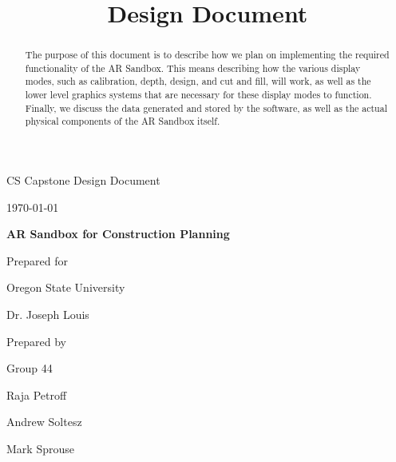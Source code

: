 \documentclass[onecolumn, draftclsnofoot,10pt, compsoc]{IEEEtran}
\title{Design Document}
\def \CapstoneTeamName{		Team Sandy}
\def \CapstoneTeamNumber{		44}
\def \GroupMemberOne{			Raja Petroff			}
\def \GroupMemberTwo{			Andrew Soltesz			}
\def \GroupMemberThree{			Mark Sprouse}
\def \CapstoneProjectName{		AR Sandbox for Construction Planning}
\def \CapstoneSponsorCompany{	Oregon State University}
\def \CapstoneSponsorPerson{		Dr. Joseph Louis}
\def \DocType{		%
				Design Document
				}
\newcommand{\NameSigPair}[1]{\par
\makebox[2.75in][r]{#1} \hfil 	\makebox[3.25in]{\makebox[2.25in]{\hrulefill} \hfill		\makebox[.75in]{\hrulefill}}
\par\vspace{-12pt} \textit{\tiny\noindent
\makebox[2.75in]{} \hfil		\makebox[3.25in]{\makebox[2.25in][r]{Signature} \hfill	\makebox[.75in][r]{Date}}}}
\renewcommand{\NameSigPair}[1]{#1}
\begin{document}
\begin{titlepage}
    \begin{singlespace}
        \hfill 
        \par\vspace{.2in}
        \centering
        \scshape{
            \huge CS Capstone \DocType \par
            {\large\today}\par
            \vspace{.5in}
            \textbf{\Huge\CapstoneProjectName}\par
            \vfill
            {\large Prepared for}\par
            \Huge \CapstoneSponsorCompany\par
            \vspace{5pt}
            {\Large\NameSigPair{\CapstoneSponsorPerson}\par}
            {\large Prepared by }\par
            Group\CapstoneTeamNumber\par
            \vspace{5pt}
            {\Large
                \NameSigPair{\GroupMemberOne}\par
                \NameSigPair{\GroupMemberTwo}\par
                \NameSigPair{\GroupMemberThree}\par
            }
            \vspace{20pt}
        }
        \begin{abstract}
      	The purpose of this document is to describe how we plan on implementing the required functionality of the AR Sandbox.
        This means describing how the various display modes, such as calibration, depth, design, and cut and fill, will work, as well as the lower level graphics systems that are necessary for these display modes to function.
        Finally, we discuss the data generated and stored by the software, as well as the actual physical components of the AR Sandbox itself.
        \end{abstract}     
    \end{singlespace}
\end{titlepage}
\newpage
{}
\tableofcontents
\listoffigures
\clearpage
\end{document}
